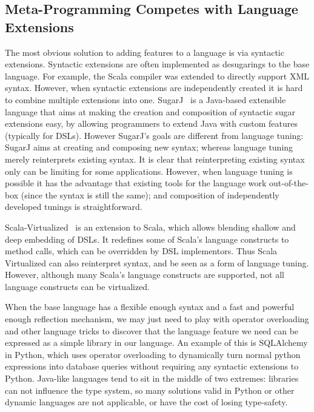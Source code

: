 \subsection{Meta-Programming Competes with Language Extensions}
The most obvious solution to adding features to a language is via syntactic
extensions. Syntactic extensions are often implemented as 
desugarings to the base language. For example,
the Scala compiler was extended to directly support XML syntax.
However, when syntactic extensions are independently created it is hard
to combine multiple extensions into one.
SugarJ~\cite{erdweg11sugarj} is a Java-based extensible language that
aims at making the creation and composition of syntactic sugar
extensions easy, by allowing programmers to extend Java with custom
features (typically for DSLs). However SugarJ's goals are different 
from language tuning: SugarJ aims at creating and composing new syntax; 
whereas language tuning merely reinterprets existing syntax. It is 
clear that reinterpreting existing syntax only can be limiting 
for some applications. However, when language tuning is possible 
it has the advantage that existing tools for the language work 
out-of-the-box (since the syntax is still the same); and composition
of independently developed tunings is straightforward.

Scala-Virtualized~\cite{Rompf2012scalavirtualized} is an extension to Scala, 
which allows blending shallow and deep embedding of DSLs. It redefines 
some of Scala's language constructs to method calls, 
which can be overridden by DSL implementors. Thus Scala Virtualized  
can also reinterpret syntax, and be seen as a form of language tuning. 
However, although many Scala's language constructs are supported, 
not all language constructs can be virtualized.



When the base language has a flexible enough syntax and a fast and
powerful enough reflection mechanism, we may just need to play with
operator overloading and other language tricks to discover that the
language feature we need can be expressed as a simple library in our
language. An example of this is SQLAlchemy\cite{} in
Python, which uses operator overloading to dynamically turn normal python expressions into database queries
without requiring any syntactic extensions to Python.
Java-like languages tend to sit in the middle of two extremes:
libraries can not influence the type system, so many solutions valid
in Python or other dynamic languages are not applicable, or have the
cost of losing type-safety.


